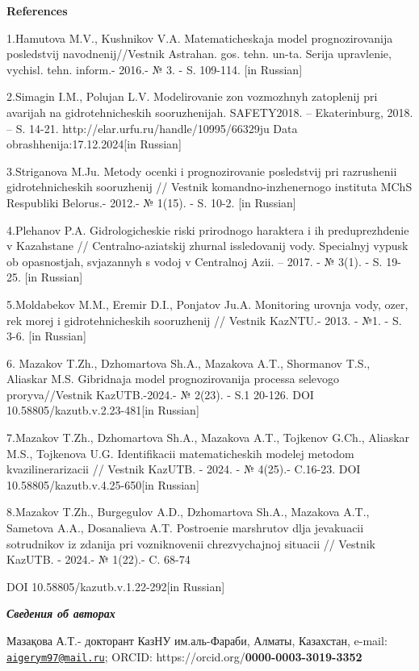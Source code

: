 \documentclass[
]{article}
\begin{document}
\textbf{References}

1.Hamutova M.V., Kushnikov V.A. Matematicheskaja model\textquotesingle{}
prognozirovanija posledstvij navodnenij//Vestnik Astrahan. gos. tehn.
un-ta. Serija upravlenie, vychisl. tehn. inform.- 2016.- № 3. - S.
109-114. {[}in Russian{]}

2.Simagin I.M., Polujan L.V. Modelirovanie zon vozmozhnyh zatoplenij pri
avarijah na gidrotehnicheskih sooruzhenijah. SAFETY2018. --
Ekaterinburg, 2018. -- S. 14-21.
http://elar.urfu.ru/handle/10995/66329ju Data
obrashhenija:17.12.2024{[}in Russian{]}

3.Striganova M.Ju. Metody ocenki i prognozirovanie posledstvij pri
razrushenii gidrotehnicheskih sooruzhenij // Vestnik
komandno-inzhenernogo instituta MChS Respubliki
Belorus\textquotesingle.- 2012.- № 1(15). - S. 10-2. {[}in Russian{]}

4.Plehanov P.A. Gidrologicheskie riski prirodnogo haraktera i ih
preduprezhdenie v Kazahstane // Central\textquotesingle no-aziatskij
zhurnal issledovanij vody. Special\textquotesingle nyj vypusk ob
opasnostjah, svjazannyh s vodoj v Central\textquotesingle noj Azii. --
2017. - № 3(1). - S. 19-25. {[}in Russian{]}

5.Moldabekov M.M., Eremir D.I., Ponjatov Ju.A. Monitoring urovnja vody,
ozer, rek morej i gidrotehnicheskih sooruzhenij // Vestnik KazNTU.-
2013. - №1. - S. 3-6. {[}in Russian{]}

6. Mazakov T.Zh., Dzhomartova Sh.A., Mazakova A.T., Shormanov T.S.,
Aliaskar M.S. Gibridnaja model\textquotesingle{} prognozirovanija
processa selevogo proryva//Vestnik KazUTB.-2024.- № 2(23). - S.1 20-126.
DOI 10.58805/kazutb.v.2.23-481{[}in Russian{]}

7.Mazakov T.Zh., Dzhomartova Sh.A., Mazakova A.T., Tojkenov G.Ch.,
Aliaskar M.S., Tojkenova U.G. Identifikacii matematicheskih modelej
metodom kvazilinerarizacii // Vestnik KazUTB. - 2024. - № 4(25).-
C.16-23. DOI 10.58805/kazutb.v.4.25-650{[}in Russian{]}

8.Mazakov T.Zh., Burgegulov A.D., Dzhomartova Sh.A., Mazakova A.T.,
Sametova A.A., Dosanalieva A.T. Postroenie marshrutov dlja jevakuacii
sotrudnikov iz zdanija pri vozniknovenii chrezvychajnoj situacii //
Vestnik KazUTB. - 2024.- № 1(22).- C. 68-74

DOI 10.58805/kazutb.v.1.22-292{[}in Russian{]}

\emph{\textbf{Сведения об авторах}}

Мазақова А.Т.- докторант КазНУ им.аль-Фараби, Алматы, Казахстан, e-mail:
\href{mailto:aigerym97@mail.ru}{\nolinkurl{aigerym97@mail.ru}}; ORCID:
https://orcid.org/\textbf{0000-0003-3019-3352}
\end{document}
